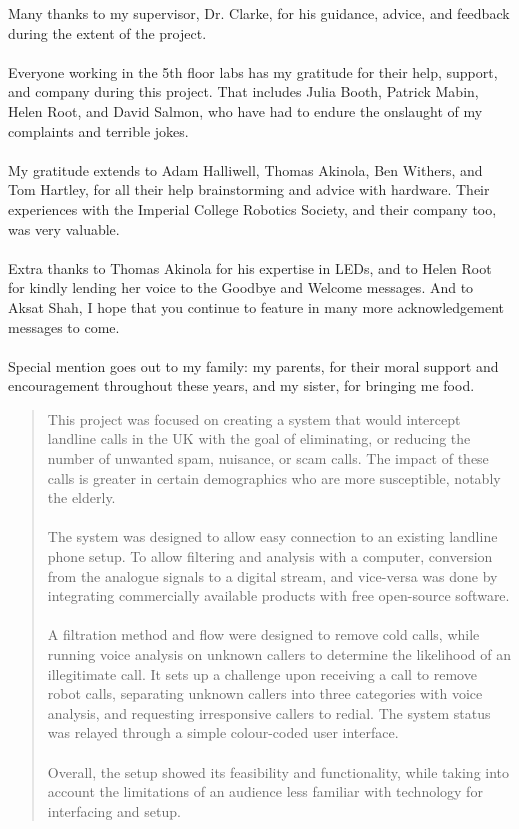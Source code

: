 \documentclass[12pt,a4paper]{report}
\begin{document}
\begin{acknowledgments}
 	\huge M\normalsize any thanks to my supervisor, Dr. Clarke, for his guidance, advice, and feedback during the extent of the project.
	\\\\
	\huge E\normalsize veryone working in the 5th floor labs has my gratitude for their help, support, and company during this project. That includes Julia Booth, Patrick Mabin, Helen Root, and David Salmon, who have had to endure the onslaught of my complaints and terrible jokes.
	\\\\
	\huge M\normalsize y gratitude extends to Adam Halliwell, Thomas Akinola, Ben Withers, and Tom Hartley, for all their help brainstorming and advice with hardware. Their experiences with the Imperial College Robotics Society, and their company too, was very valuable.
	\\\\
	\huge E\normalsize xtra thanks to Thomas Akinola for his expertise in LEDs, and to Helen Root for kindly lending her voice to the Goodbye and Welcome messages. And to Aksat Shah, I hope that you continue to feature in many more acknowledgement messages to come.
	\\\\
	\huge S\normalsize pecial mention goes out to my family: my parents, for their moral support and encouragement throughout these years, and my sister, for bringing me food.
\end{acknowledgments}

\begin{abstract}
This project was focused on creating a system that would intercept landline calls in the UK with the goal of eliminating, or reducing the number of unwanted spam, nuisance, or scam calls. The impact of these calls is greater in certain demographics who are more susceptible, notably the elderly.
\\\\
The system was designed to allow easy connection to an existing landline phone setup. To allow filtering and analysis with a computer, conversion from the analogue signals to a digital stream, and vice-versa was done by integrating commercially available products with free open-source software.
\\\\
A filtration method and flow were designed to remove cold calls, while running voice analysis on unknown callers to determine the likelihood of an illegitimate call. It sets up a challenge upon receiving a call to remove robot calls, separating unknown callers into three categories with voice analysis, and requesting irresponsive callers to redial. The system status was relayed through a simple colour-coded user interface.
\\\\
Overall, the setup showed its feasibility and functionality, while taking into account the limitations of an audience less familiar with technology for interfacing and setup. 
\end{abstract}
\end{document}
